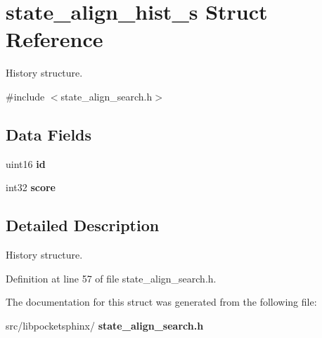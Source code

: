 \section{state\+\_\+align\+\_\+hist\+\_\+s Struct Reference}
\label{structstate__align__hist__s}


History structure.  




{\ttfamily \#include $<$state\+\_\+align\+\_\+search.\+h$>$}

\subsection*{Data Fields}
\begin{DoxyCompactItemize}
\item 
\mbox{\label{structstate__align__hist__s_a74cb4b079e03059eb0b02cb17bcadb5e}} 
uint16 {\bfseries id}
\item 
\mbox{\label{structstate__align__hist__s_aa8c7206b0491eefdfa2eaaf5a2834652}} 
int32 {\bfseries score}
\end{DoxyCompactItemize}


\subsection{Detailed Description}
History structure. 

Definition at line 57 of file state\+\_\+align\+\_\+search.\+h.



The documentation for this struct was generated from the following file\+:\begin{DoxyCompactItemize}
\item 
src/libpocketsphinx/\textbf{ state\+\_\+align\+\_\+search.\+h}\end{DoxyCompactItemize}
